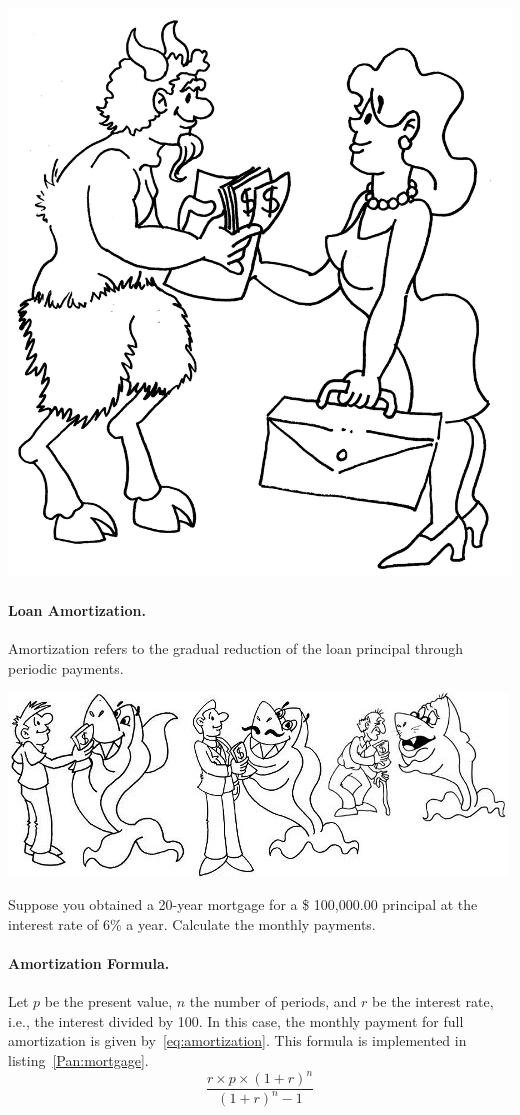 \documentclass[a4paper,12pt]{book}
\begin{document}
\includegraphics[scale=0.5]{figs-prefix/deuspan.jpg}

\paragraph{Loan Amortization.}
Amortization refers to the gradual reduction
of the loan principal through periodic payments.

\includegraphics{figs-prefix/agingshark.jpg}

Suppose you obtained a 20-year mortgage
for a \$ 100,000.00 principal at the interest
rate of 6\% a year. Calculate the monthly payments.

\paragraph{Amortization Formula.} Let $p$ be the
present value, $n$ the number of periods,
and $r$ be the
interest rate, i.e., the interest divided by 100.
In this case, the monthly payment for full
amortization is given by~\ref{eq:amortization}.
This formula is implemented in
listing~\ref{Pan:mortgage}.
\begin{equation}
\frac{r\times p\times(1+r)^n}{(1+r)^n - 1}
\label{eq:amortization}
\end{equation}
\end{document}
